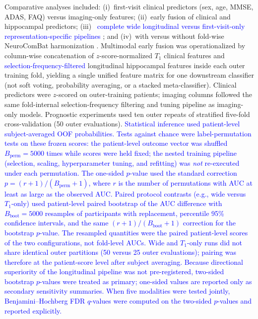 \documentclass[review]{elsarticle}
\newcommand{\corrigir}[2]{%
	\textcolor{red}{\sout{#1}} %
	\textcolor{blue}{#2}%
}
\begin{document}
	Comparative analyses included: (i)~first-visit clinical predictors (sex, age, MMSE, ADAS, FAQ) versus imaging-only features; (ii)~early fusion of clinical and hippocampal predictors; (iii)~\corrigir{}{complete wide longitudinal versus first-visit-only representation-specific pipelines}; and (iv)~with versus without fold-wise NeuroComBat harmonization \citep{fortin-2018}. Multimodal early fusion was operationalized by column-wise concatenation of $z$-score-normalized $T_1$ clinical features and \corrigir{}{selection-frequency-filtered} longitudinal hippocampal features inside each outer training fold, yielding a single unified feature matrix for one downstream classifier (not soft voting, probability averaging, or a stacked meta-classifier). Clinical predictors were $z$-scored on outer-training patients; imaging columns followed the same fold-internal selection-frequency filtering and tuning pipeline as imaging-only models. Prognostic experiments used ten outer repeats of stratified five-fold cross-validation (50 outer evaluations). \corrigir{}{Statistical inference used patient-level subject-averaged OOF probabilities. Tests against chance were label-permutation tests on these frozen scores: the patient-level outcome vector was shuffled $B_{\mathrm{perm}}=5000$ times while scores were held fixed; the nested training pipeline (selection, scaling, hyperparameter tuning, and refitting) was \emph{not} re-executed under each permutation. The one-sided $p$-value used the standard correction $p=(r+1)/(B_{\mathrm{perm}}+1)$, where $r$ is the number of permutations with AUC at least as large as the observed AUC. Paired protocol contrasts (e.g., wide versus $T_1$-only) used patient-level paired bootstrap of the AUC difference with $B_{\mathrm{boot}}=5000$ resamples of participants with replacement, percentile 95\% confidence intervals, and the same $(r+1)/(B_{\mathrm{boot}}+1)$ correction for the bootstrap $p$-value. The resampled quantities were the paired patient-level scores of the two configurations, not fold-level AUCs. Wide and $T_1$-only runs did not share identical outer partitions (50 versus 25 outer evaluations); pairing was therefore at the patient-score level after subject averaging. Because directional superiority of the longitudinal pipeline was not pre-registered, two-sided bootstrap $p$-values were treated as primary; one-sided values are reported only as secondary sensitivity summaries. When five modalities were tested jointly, Benjamini--Hochberg FDR $q$-values were computed on the two-sided $p$-values and reported explicitly.}
	
\end{document}
